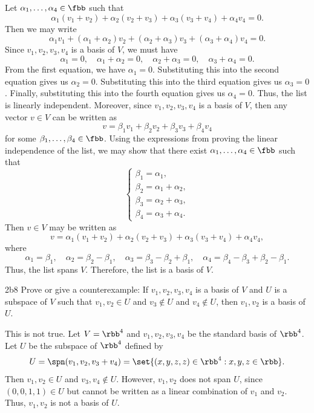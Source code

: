 \begin{sol}
    Let $\alpha_1, \ldots, \alpha_4 \in \fbb$ such that
    \[
    	\alpha_1(v_1 + v_2) + \alpha_2(v_2 + v_3) + \alpha_3(v_3 + v_4) + \alpha_4 v_4 = 0.
    \]
    Then we may write
    \[
    	\alpha_1v_1 + (\alpha_1 + \alpha_2)v_2 + (\alpha_2 + \alpha_3)v_3 + (\alpha_3 + \alpha_4)v_4 = 0.
    \]
    Since $v_1, v_2, v_3, v_4$ is a basis of $V$, we must have
    \[
    	\alpha_1 = 0, \quad \alpha_1 + \alpha_2 = 0, \quad \alpha_2 + \alpha_3 = 0, \quad \alpha_3 + \alpha_4 = 0.
    \]
    From the first equation, we have $\alpha_1 = 0$.
	Substituting this into the second equation gives us $\alpha_2 = 0$.
	Substituting this into the third equation gives us $\alpha_3 = 0$.
	Finally, substituting this into the fourth equation gives us $\alpha_4 = 0$.
	Thus, the list is linearly independent.
	Moreover, since $v_1, v_2, v_3, v_4$ is a basis of $V$, then any vector $v \in V$ can be written as
    \[
    	v = \beta_1 v_1 + \beta_2 v_2 + \beta_3 v_3 + \beta_4 v_4
    \]
    for some $\beta_1, \ldots, \beta_4 \in \fbb$.
	Using the expressions from proving the linear independence of the list, we may show that there exist $\alpha_1, \ldots, \alpha_4 \in \fbb$ such that
    \[
        \begin{cases}
            \beta_1 = \alpha_1, \\
            \beta_2 = \alpha_1 + \alpha_2, \\
            \beta_3 = \alpha_2 + \alpha_3, \\
            \beta_4 = \alpha_3 + \alpha_4.
        \end{cases}
    \]
    Then $v \in V$ may be written as
    \[
    	v = \alpha_1(v_1 + v_2) + \alpha_2(v_2 + v_3) + \alpha_3(v_3 + v_4) + \alpha_4 v_4,
    \]
    where
    \[
    	\alpha_1 = \beta_1, \quad \alpha_2 = \beta_2 - \beta_1, \quad \alpha_3 = \beta_3 - \beta_2 + \beta_1, \quad \alpha_4 = \beta_4 - \beta_3 + \beta_2 - \beta_1.
    \]
    Thus, the list spans $V$.
	Therefore, the list is a basis of $V$.
\end{sol}

\begin{exercise}{2b8}
    Prove or give a counterexample: If $v_1, v_2, v_3, v_4$ is a basis of $V$ and $U$ is a subspace of $V$ such that $v_1, v_2 \in U$ and $v_3 \notin U$ and $v_4 \notin U$, then $v_1, v_2$ is a basis of $U$.
\end{exercise}

\begin{sol}
    This is not true.
	Let $V = \rbb^4$ and $v_1, v_2, v_3, v_4$ be the standard basis of $\rbb^4$.
	Let $U$ be the subspace of $\rbb^4$ defined by
    \[
    	U = \spn(v_1, v_2, v_3 + v_4) = \set{(x, y, z, z) \in \rbb^4 : x, y, z \in \rbb}.
    \]
    Then $v_1, v_2 \in U$ and $v_3, v_4 \notin U$.
	However, $v_1, v_2$ does not span $U$, since $(0, 0, 1, 1) \in U$ but cannot be written as a linear combination of $v_1$ and $v_2$.
	Thus, $v_1, v_2$ is not a basis of $U$.
\end{sol}

